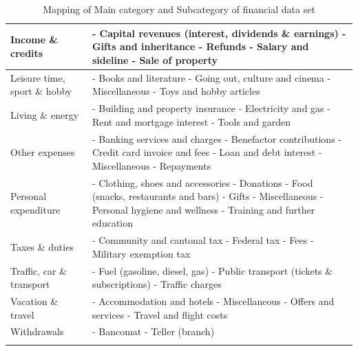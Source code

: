 \begin{longtable}{ | p{5cm} | p{9cm} |}
	\hline
	Income \& credits &
	- Capital revenues (interest, dividends \& earnings) \newline
	- Gifts and inheritance \newline
	- Refunds \newline
	- Salary and sideline \newline
	- Sale of property \\
	\hline
	Leisure time, sport \& hobby &
	- Books and literature \newline
	- Going out, culture and cinema \newline
	- Miscellaneous \newline
	- Toys and hobby articles \\
	\hline
	Living \& energy &
	- Building and property insurance \newline
	- Electricity and gas \newline
	- Rent and mortgage interest \newline
	- Tools and garden \\
	\hline
	Other expenses &
	- Banking services and charges \newline
	- Benefactor contributions \newline
	- Credit card invoice and fees \newline
	- Loan and debt interest \newline
	- Miscellaneous \newline
	- Repayments \\
	\hline
	Personal expenditure &
	- Clothing, shoes and accessories \newline
	- Donations \newline
	- Food (snacks, restaurants and bars) \newline
	- Gifts \newline
	- Miscellaneous \newline
	- Personal hygiene and wellness \newline
	- Training and further education \\
	\hline
	Taxes \& duties &
	- Community and cantonal tax \newline
	- Federal tax \newline
	- Fees \newline
	- Military exemption tax \\
	\hline
	Traffic, car \& transport &
	- Fuel (gasoline, diesel, gas) \newline
	- Public transport (tickets \& subscriptions) \newline
	- Traffic charges \\
	\hline
	Vacation \& travel &
	- Accommodation and hotels \newline
	- Miscellaneous \newline
	- Offers and services \newline
	- Travel and flight costs \\
	\hline
	Withdrawals &
	- Bancomat \newline
	- Teller (branch) \\
	\hline
	\caption{Mapping of Main category and Subcategory of financial data set}
	\label{tbl:financialcategories}
\end{longtable}

